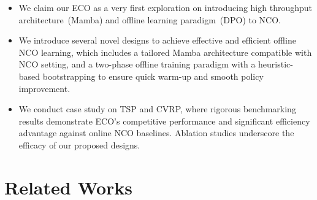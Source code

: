 \documentclass{article}
\theoremstyle{plain}
\theoremstyle{definition}
\theoremstyle{remark}
\begin{document}
\begin{itemize}[leftmargin=*]
\vspace{-10pt}
    \item[\ding{182}]  We claim our ECO as a very first exploration on introducing high throughput architecture~(Mamba) and offline learning paradigm~(DPO) to NCO.
    \vspace{-7pt}
    \item[\ding{183}]  We introduce several novel designs to achieve effective and efficient offline NCO learning, which includes a tailored Mamba architecture compatible with NCO setting, and a two-phase offline training paradigm with a heuristic-based bootstrapping to ensure quick warm-up and smooth policy improvement.
    \vspace{-7pt}
    \item[\ding{184}]  We conduct case study on TSP and CVRP, where rigorous benchmarking results demonstrate ECO's competitive performance and significant efficiency advantage against online NCO baselines. Ablation studies underscore the efficacy of our proposed designs.
    \vspace{-7pt}
\end{itemize}

\section{Related Works}
\vspace{-5pt}
\end{document}
